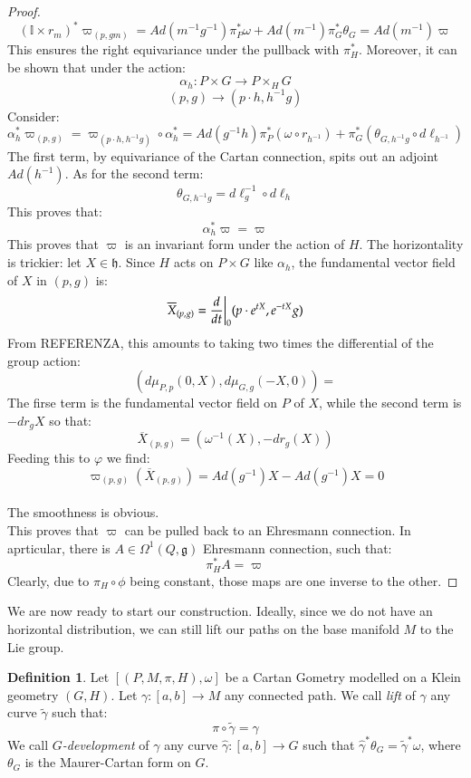 \documentclass[12pt,a4paper]{report}
\theoremstyle{definition}
\newtheorem{Def}{Definition}[chapter]
\theoremstyle{Theorem}
\theoremstyle{break}
\theoremstyle{definition}
\begin{document}
\begin{proof}
		$$(\mathbb{I}\times r_m)^*\varpi_{(p,gm)}=Ad(m^{-1}g^{-1})\pi_P^*\omega+Ad(m^{-1})\pi_G^*\theta_{G}=Ad(m^{-1})\varpi$$
		This ensures the right equivariance under the pullback with $\pi_H^*$. Moreover, it can be shown that under the action:
		$$\alpha_h:P\times G\rightarrow P\times_H G$$
		$$(p,g)\rightarrow (p\cdot h, h^{-1}g)$$
		Consider:
		$$\alpha_h^*\varpi_{(p,g)}=\varpi_{(p\cdot h,h^{-1}g)}\circ \alpha^*_h=Ad(g^{-1}h)\pi_P^*({\omega\circ r_{h^{-1}}})+\pi_G^*(\theta_{G,h^{-1}g}\circ d\ell_{h^{-1}})$$
		The first term, by equivariance of the Cartan connection, spits out an adjoint $Ad(h^{-1})$. As for the second term:
		$$\theta_{G,h^{-1}g}=d\ell_g^{-1}\circ d\ell_{h}$$
		This proves that:
		$$\alpha_h^*\varpi=\varpi$$
		This proves that $\varpi$ is an invariant form under the action of $H$. The horizontality is trickier: let $X\in \mathfrak{h}$. Since $H$ acts on $P\times G$ like $\alpha_h$, the fundamental vector field of $X$ in $(p,g)$ is:
		$$\overline{X}_{(p,g)}={d\over dt}\bigg|_0 (p\cdot e^{tX},e^{-tX}g)$$ From REFERENZA, this amounts to taking two times the differential of the group action:
		$$(d\mu_{P,p}(0,X),d\mu_{G,g}(-X,0))=$$
		The firse term is the fundamental vector field on $P$ of $X$, while the second term is $-dr_gX$ so that:
		$$\overline{X}_{(p,g)}=(\omega^{-1}(X),-dr_g(X))$$
		Feeding this to $\varphi$ we find:
		$$\varpi_{(p,g)}(\overline{X}_{(p,g)})=Ad(g^{-1})X-Ad(g^{-1})X=0$$
		\\
		The smoothness is obvious.\\ This proves that $\varpi$ can be pulled back to an Ehresmann connection. In aprticular, there is $A\in\Omega^1(Q,\mathfrak{g})$ Ehresmann connection, such that:
		$$\pi^*_HA=\varpi$$ 
		Clearly, due to $\pi_H\circ \phi$ being constant, those maps are one inverse to the other.
	\end{proof}
	We are now ready to start our construction. Ideally, since we do not have an horizontal distribution, we can still lift our paths on the base manifold $M$ to the Lie group. 
	\begin{Def}
		Let $[(P,M,\pi,H),\omega]$ be a Cartan Gometry modelled on a Klein geometry $(G,H)$. Let $\gamma:[a,b]\rightarrow M$ any connected path. We call \textit{lift} of $\gamma$ any curve $\tilde{\gamma}$ such that:
		$$\pi\circ\tilde{\gamma}=\gamma$$
		We call \textit{$G$-development} of $\gamma$ any curve $\hat{\gamma}:[a,b]\rightarrow G$ such that $\hat{\gamma}^*\theta_G=\tilde{\gamma}^*\omega$, where $\theta_G$ is the Maurer-Cartan form on $G$.
	\end{Def}
\end{document}
